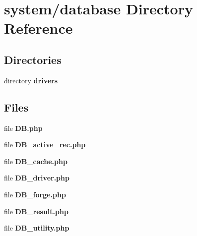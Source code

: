 \section{system/database Directory Reference}
\label{dir_64210b8a51975efd6934237ae7a76110}
\subsection*{Directories}
\begin{DoxyCompactItemize}
\item 
directory {\bf drivers}
\end{DoxyCompactItemize}
\subsection*{Files}
\begin{DoxyCompactItemize}
\item 
file {\bf D\-B.\-php}
\item 
file {\bf D\-B\-\_\-active\-\_\-rec.\-php}
\item 
file {\bf D\-B\-\_\-cache.\-php}
\item 
file {\bf D\-B\-\_\-driver.\-php}
\item 
file {\bf D\-B\-\_\-forge.\-php}
\item 
file {\bf D\-B\-\_\-result.\-php}
\item 
file {\bf D\-B\-\_\-utility.\-php}
\end{DoxyCompactItemize}
